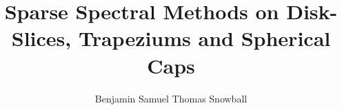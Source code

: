 \documentclass[a4paper,12pt,twoside]{report}
\begin{document}
\title{\LARGE {\bf Sparse Spectral Methods on Disk-Slices, Trapeziums and Spherical Caps}\\
 \vspace*{6mm}
}
\author{Benjamin Samuel Thomas Snowball}

\maketitle


\preface











\body










\newpage
{}
\printnomenclature


\newpage
{}
%

\end{document}
